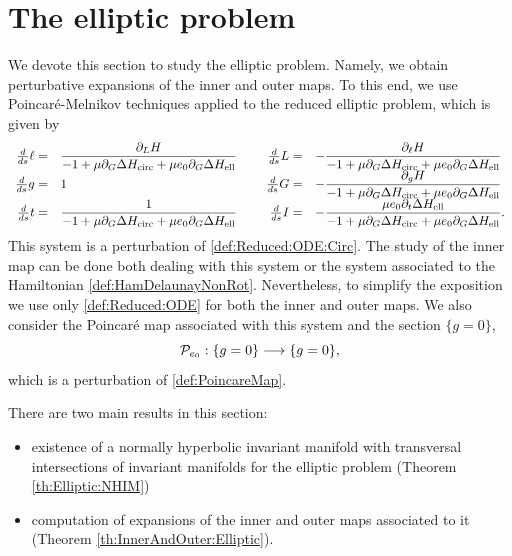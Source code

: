 \section{The elliptic problem}\label{sec:Elliptic}
We devote this section to study the elliptic problem. Namely,
we obtain perturbative expansions of the inner and outer maps. To this end,
we use Poincar{\'e}-Melnikov techniques applied to the reduced elliptic problem, which is given by
\begin{equation}\label{def:Reduced:ODE}
  \begin{array}{rlcrl}
    \frac{d}{ds} \ell=&\displaystyle\frac{\partial_L H}{-1+\mu\partial_G\Delta H_{\mathrm{circ}} +\mu e_0\partial_G\Delta H_{\mathrm{ell}}}&\text{   }&\frac{d}{ds} L=&\displaystyle-\frac{\partial_\ell H}{-1+\mu\partial_G\Delta H_{\mathrm{circ}} +\mu e_0\partial_G\Delta H_{\mathrm{ell}}}\\
    \frac{d}{ds} g=&1&\text{   }&\frac{d}{ds} G=&\displaystyle-\frac{\partial_g H}{-1+\mu\partial_G\Delta H_{\mathrm{circ}} +\mu e_0\partial_G\Delta H_{\mathrm{ell}}}\\
    \frac{d}{ds} t=&\displaystyle\frac{1}{-1+\mu\partial_G\Delta H_{\mathrm{circ}} +\mu e_0\partial_G\Delta H_{\mathrm{ell}}}&\text{   }&\frac{d}{ds} I=&\displaystyle-\frac{\mu e_0\partial_t \Delta H_{\mathrm{ell}}}{-1+\mu\partial_G\Delta H_{\mathrm{circ}} +\mu e_0\partial_G\Delta H_{\mathrm{ell}}}.
  \end{array}
\end{equation}
This system is a perturbation of \eqref{def:Reduced:ODE:Circ}. The study of
the inner map can be done both dealing with this system or the system associated
to the Hamiltonian \eqref{def:HamDelaunayNonRot}. Nevertheless, to simplify the exposition
we use only \eqref{def:Reduced:ODE} for both the inner and outer maps.  We also
consider the Poincar{\'e} map associated with this system and the section $\{g=0\}$,
\begin{equation}\label{def:Elliptic:Poincare}
  \mathcal{P}_{e_0}:\{g=0\}\longrightarrow \{g=0\},
\end{equation}
which is a perturbation of \eqref{def:PoincareMap}.

There are two main results in this section:
\begin{itemize}
\item
  existence of a normally hyperbolic invariant manifold
  with transversal intersections of invariant manifolds for the elliptic problem
  (Theorem \ref{th:Elliptic:NHIM})
\item  computation of expansions of the inner and outer maps associated
  to it (Theorem \ref{th:InnerAndOuter:Elliptic}).
\end{itemize}

